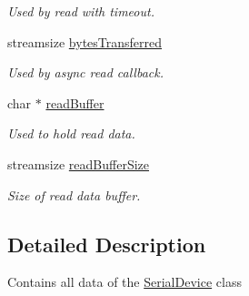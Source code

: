 \begin{DoxyCompactItemize}
\begin{DoxyCompactList}\small\item\em Used by read with timeout. \end{DoxyCompactList}\item 
\hypertarget{class_serial_device_impl_a646a10d40ea753daceff2a751ceacc7d}{streamsize \hyperlink{class_serial_device_impl_a646a10d40ea753daceff2a751ceacc7d}{bytes\-Transferred}}\label{class_serial_device_impl_a646a10d40ea753daceff2a751ceacc7d}

\begin{DoxyCompactList}\small\item\em Used by async read callback. \end{DoxyCompactList}\item 
\hypertarget{class_serial_device_impl_a12189dc0f81ad342b3d575985bf8d39a}{char $\ast$ \hyperlink{class_serial_device_impl_a12189dc0f81ad342b3d575985bf8d39a}{read\-Buffer}}\label{class_serial_device_impl_a12189dc0f81ad342b3d575985bf8d39a}

\begin{DoxyCompactList}\small\item\em Used to hold read data. \end{DoxyCompactList}\item 
\hypertarget{class_serial_device_impl_a22ede5c2637b9e135eced2add0f212d7}{streamsize \hyperlink{class_serial_device_impl_a22ede5c2637b9e135eced2add0f212d7}{read\-Buffer\-Size}}\label{class_serial_device_impl_a22ede5c2637b9e135eced2add0f212d7}

\begin{DoxyCompactList}\small\item\em Size of read data buffer. \end{DoxyCompactList}\end{DoxyCompactItemize}


\subsection{Detailed Description}
Contains all data of the \hyperlink{class_serial_device}{Serial\-Device} class 

